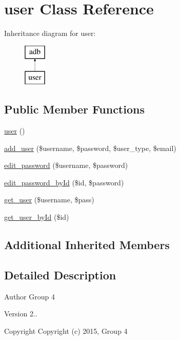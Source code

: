\hypertarget{classuser}{}\section{user Class Reference}
\label{classuser}
Inheritance diagram for user\+:\begin{figure}[H]
\begin{center}
\leavevmode
\includegraphics[height=2.000000cm]{classuser}
\end{center}
\end{figure}
\subsection*{Public Member Functions}
\begin{DoxyCompactItemize}
\item 
\hyperlink{classuser_ae8a275690ff1b618e1947378b0ed73ae}{user} ()
\item 
\hyperlink{classuser_adffa9d60b80915c54900431cf1e8a62f}{add\+\_\+user} (\$username, \$password, \$user\+\_\+type, \$email)
\item 
\hyperlink{classuser_abd42228b455689f2531c0a99cab7c108}{edit\+\_\+password} (\$username, \$password)
\item 
\hyperlink{classuser_a6c61b18644b606b5cce97c4625a0f74a}{edit\+\_\+password\+\_\+by\+Id} (\$id, \$password)
\item 
\hyperlink{classuser_a0cbdcbef1264b45ca0fd86e25a00ab30}{get\+\_\+user} (\$username, \$pass)
\item 
\hyperlink{classuser_afa7762627f81ba410e471074d2def977}{get\+\_\+user\+\_\+by\+Id} (\$id)
\end{DoxyCompactItemize}
\subsection*{Additional Inherited Members}


\subsection{Detailed Description}
\begin{DoxyAuthor}{Author}
Group 4 
\end{DoxyAuthor}
\begin{DoxyVersion}{Version}
2.. 
\end{DoxyVersion}
\begin{DoxyCopyright}{Copyright}
Copyright (c) 2015, Group 4 
\end{DoxyCopyright}


